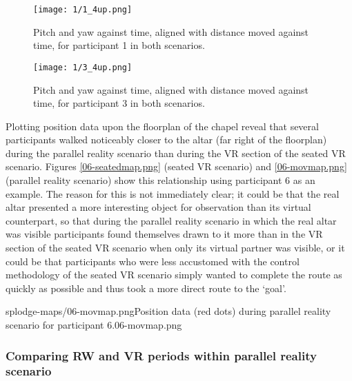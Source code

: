 \vspace{4cm}

\begin{figure}[h]
	\begin{center}
	\texttt{[image: 1/1\_4up.png]}
	\caption{Pitch and yaw against time, aligned with distance moved against time, for participant 1 in both scenarios.}
	\label{1_4up.png}
	\end{center}
\end{figure}

\begin{figure}
	\begin{center}
	\texttt{[image: 1/3\_4up.png]}
	\caption{Pitch and yaw against time, aligned with distance moved against time, for participant 3 in both scenarios.}
	\label{3_4up.png}
	\end{center}
\end{figure}


\clearpage

Plotting position data upon the floorplan of the chapel reveal that several participants walked noticeably closer to the altar (far right of the floorplan) during the parallel reality scenario than during the VR section of the seated VR scenario. Figures \ref{06-seatedmap.png} (seated VR scenario) and \ref{06-movmap.png} (parallel reality scenario) show this relationship using participant 6 as an example. The reason for this is not immediately clear; it could be that the real altar presented a more interesting object for observation than its virtual counterpart, so that during the parallel reality scenario in which the real altar was visible participants found themselves drawn to it more than in the VR section of the seated VR scenario when only its virtual partner was visible, or it could be that participants who were less accustomed with the control methodology of the seated VR scenario simply wanted to complete the route as quickly as possible and thus took a more direct route to the `goal'.

       {splodge-maps/06-movmap.png}{Position data (red dots) during parallel reality scenario for participant 6.}{06-movmap.png}


\subsubsection{Comparing RW and VR periods within parallel reality scenario}

